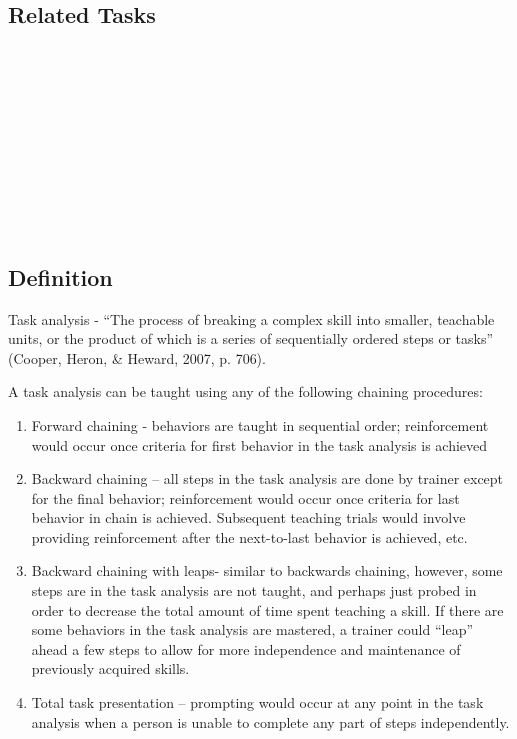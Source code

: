 \subsection{Related Tasks}
\fouraSeven{}\\
\fourdThree{}\\
\fourdFour{}\\
\fourdFive{}\\
\foureOne{}\\
\foureTwo{}\\
\fouriOne{}\\
\fourjThree{}\\
\fourFKTen{}\\
%
%
%
%
%
%
%
%
%
%
\section{\fourdSeven{}}
\subsection{Definition}
Task analysis - ``The process of breaking a complex skill into smaller, teachable units, or the product of which is a series of sequentially ordered steps or tasks'' (Cooper, Heron, \& Heward, 2007, p. 706).

A task analysis can be taught using any of the following chaining procedures:
\begin{enumerate}
\item Forward chaining -  behaviors are taught in sequential order; reinforcement would occur once criteria for first behavior in the task analysis is achieved
\item Backward chaining – all steps in the task analysis are done by trainer except for the final behavior; reinforcement would occur once criteria for last behavior in chain is achieved.  Subsequent teaching trials would involve providing reinforcement after the next-to-last behavior is achieved, etc.
\item  Backward chaining with leaps- similar to backwards chaining, however, some steps are in the task analysis are not taught, and perhaps just probed in order to decrease the total amount of time spent teaching a skill.  If there are some behaviors in the task analysis are mastered, a trainer could ``leap'' ahead a few steps to allow for more independence and maintenance of previously acquired skills.
\item Total task presentation – prompting would occur at any point in the task analysis when a person is unable to complete any part of steps independently.
\end{enumerate}
%
